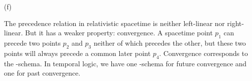 \begin{solution}
\begin{sollist}
    \item[(f)] 
    \medskip
  \end{sollist}
\end{solution}


The precedence relation in relativistic spacetime is neither left-linear nor
right-linear. But it has a weaker property: convergence.
%
%
A spacetime point $p_1$ can precede two points $p_2$ and $p_3$ neither of which
precedes the other, but these two points will always precede a common later
point $p_4$. Convergence corresponds to the -schema. In temporal
logic, we have one -schema for future convergence and one for past
convergence.
%
\begin{principles}
\\
\end{principles}

